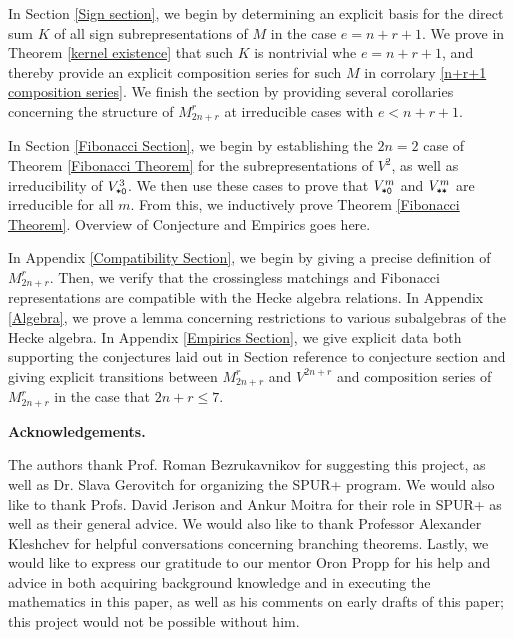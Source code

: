 \documentclass{amsart}
\newcommand{\fakesubsection}[1]{
    \vspace{7pt}
    \noindent \textbf{#1.}
  }
\begin{document}
  \vspace{5pt}
  In Section \ref{Sign section}, we begin by determining an explicit basis for the direct sum $K$ of all sign subrepresentations of $M$ in the case $e = n + r + 1$.
  We prove in Theorem \ref{kernel existence} that such $K$ is nontrivial whe $e = n + r + 1$, and thereby provide an explicit composition series for such $M$ in corrolary \ref{n+r+1 composition series}.
  We finish the section by providing several corollaries concerning the structure of $M_{2n + r}^r$ at irreducible cases with $e < n + r + 1$.

  \vspace{5pt}
  In Section \ref{Fibonacci Section}, we begin by establishing the $2n = 2$ case of Theorem \ref{Fibonacci Theorem} for the subrepresentations of $V^2$, as well as irreducibility of $V^3_{\texttt{*}\texttt{0}}$.
  We then use these cases to prove that $V^m_{\texttt{*}\texttt{0}}$ and $V^m_{\texttt{*}\texttt{*}}$ are irreducible for all $m$.
  From this, we inductively prove Theorem \ref{Fibonacci Theorem}.
  {\color{orange} Overview of Conjecture and Empirics goes here.}

  \vspace{5pt}
  In Appendix \ref{Compatibility Section}, we begin by giving a precise definition of $M_{2n + r}^r$.
  Then, we verify that the crossingless matchings and Fibonacci representations are compatible with the Hecke algebra relations.
  In Appendix \ref{Algebra}, we prove a lemma concerning restrictions to various subalgebras of the Hecke algebra.
  In Appendix \ref{Empirics Section}, we give explicit data both supporting the conjectures laid out in Section {\color{orange} reference to conjecture section} and giving explicit transitions between $M_{2n + r}^r$ and $V^{2n + r}$ and composition series of $M_{2n + r}^r$ in the case that $2n + r \leq 7$.

  \fakesubsection{Acknowledgements}
  The authors thank Prof. Roman Bezrukavnikov for suggesting this project, as well as Dr. Slava Gerovitch for organizing the SPUR+ program.
  We would also like to thank Profs. David Jerison and Ankur Moitra for their role in SPUR+ as well as their general advice.
  We would also like to thank Professor Alexander Kleshchev for helpful conversations concerning branching theorems.
  Lastly, we would like to express our gratitude to our mentor Oron Propp for his help and advice in both acquiring background knowledge and in executing the mathematics in this paper, as well as his comments on early drafts of this paper;
  this project would not be possible without him.
   
\end{document}
